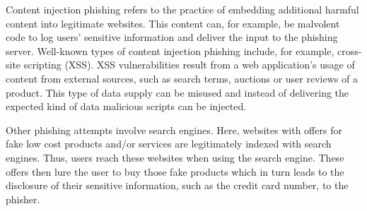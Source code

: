 \begin{description}[leftmargin=0cm]
	\item[Content Injection/XSS] Content injection phishing refers to the practice of embedding additional harmful content into legitimate websites.
 This content can, for example, be malvolent code to log users' sensitive information and deliver the input to the phishing server.
 Well-known types of content injection phishing include, for example, cross-site scripting (XSS).
XSS vulnerabilities result from a web application's usage of content from external sources, such as search terms, auctions or user reviews of a product.
 This type of data supply can be misused and instead of delivering the expected kind of data malicious scripts can be injected.

	\item[Search Engine Phishing] Other phishing attempts involve search engines.
 Here, websites with offers for fake low cost products and/or services are legitimately indexed with search engines.
 Thus, users reach these websites when using the search engine.
 These offers then lure the user to buy those fake products which in turn leads to the disclosure of their sensitive information, such as the credit card number, to the phisher.

\end{description}



